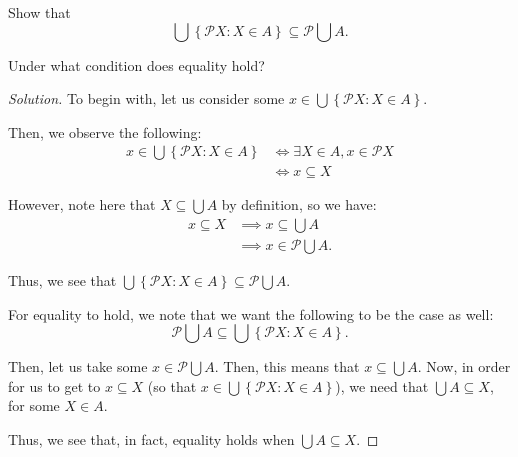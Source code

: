 \documentclass{article}
\newenvironment{solution}{\begin{proof}[Solution]}{\end{proof}}
\newcommand{\brc}[1]{ \left\{  {#1} \right\}}
\begin{document}
\begin{hw}[Problem 2.24b]
	Show that
	\begin{equation*}
		\bigcup \brc{\mathscr{P} X : X \in A} \subseteq \mathscr{P} \bigcup A.
	\end{equation*}

	Under what condition does equality hold?
\end{hw}
\begin{solution}
	To begin with, let us consider some $x \in \bigcup \brc{\mathscr{P} X : X \in A}$.
	
	Then, we observe the following:
	\begin{align*}
		x \in \bigcup \brc{\mathscr{P} X : X \in A} &\iff \exists X \in A, x \in \mathscr{P}X \\
		&\iff x \subseteq X
	\end{align*}

	However, note here that $X \subseteq \bigcup A$ by definition, so we have:
	\begin{align*}
		x \subseteq X &\implies x \subseteq \bigcup A \\
		&\implies x \in \mathscr{P} \bigcup A.
	\end{align*}

	Thus, we see that $\bigcup \brc{\mathscr{P} X : X \in A} \subseteq \mathscr{P} \bigcup A$.
	
	For equality to hold, we note that we want the following to be the case as well:
	\begin{equation*}
		\mathscr{P} \bigcup A \subseteq \bigcup \brc{\mathscr{P} X : X \in A}.
	\end{equation*}

	Then, let us take some $x \in \mathscr{P} \bigcup A$. Then, this means that $x \subseteq \bigcup A$. Now, in order for us to get to $x \subseteq X$ (so that $x \in \bigcup \brc{\mathscr{P} X : X \in A}$), we need that $\bigcup A \subseteq X$, for some $X \in A$.
	
	Thus, we see that, in fact, equality holds when $\bigcup A \subseteq X$.
\end{solution}
\end{document}
